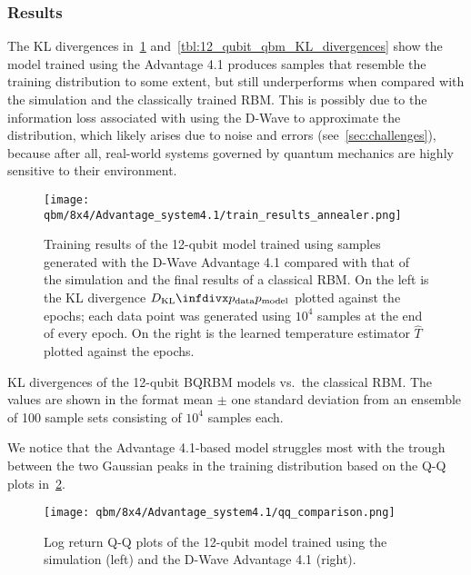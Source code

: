 \subsubsection{Results}\label{sec:qbm_annealer_results}
The KL divergences in~\cref{fig:train_results_annealer} and~\cref{tbl:12_qubit_qbm_KL_divergences} show the model trained using the Advantage 4.1 produces samples that resemble the training distribution to some extent, but still underperforms when compared with the simulation and the classically trained RBM.
This is possibly due to the information loss associated with using the D-Wave to approximate the distribution, which likely arises due to noise and errors (see~\cref{sec:challenges}), because after all, real-world systems governed by quantum mechanics are highly sensitive to their environment.
\begin{figure}[!htb]
    \begin{center}
        \texttt{[image: qbm/8x4/Advantage\_system4.1/train\_results\_annealer.png]}
    \end{center}
    \caption{
        Training results of the 12-qubit model trained using samples generated with the D-Wave Advantage 4.1 compared with that of the simulation and the final results of a classical RBM.
        On the left is the KL divergence \( \DKL{\pdata}{\pmodel} \) plotted against the epochs; each data point was generated using \( 10^4 \) samples at the end of every epoch.
        On the right is the learned temperature estimator \( \hat{T} \) plotted against the epochs.
    }
    \label{fig:train_results_annealer}
\end{figure}

\begin{table}[!htb]
    \centering
    \begin{adjustbox}{max width=\textwidth}
        
    \end{adjustbox}
    \caption{
        KL divergences of the 12-qubit BQRBM models vs.~the classical RBM.
        The values are shown in the format mean \(\pm\) one standard deviation from an ensemble of 100 sample sets consisting of \( 10^4 \) samples each.
}
    \label{tbl:12_qubit_qbm_KL_divergences}
\end{table}

We notice that the Advantage 4.1-based model struggles most with the trough between the two Gaussian peaks in the training distribution based on the Q-Q plots in~\cref{fig:qq_comparison}.
\begin{figure}[!htb]
    \begin{center}
        \texttt{[image: qbm/8x4/Advantage\_system4.1/qq\_comparison.png]}
    \end{center}
    \caption{Log return Q-Q plots of the 12-qubit model trained using the simulation (left) and the D-Wave Advantage 4.1 (right).}
    \label{fig:qq_comparison}
\end{figure}

